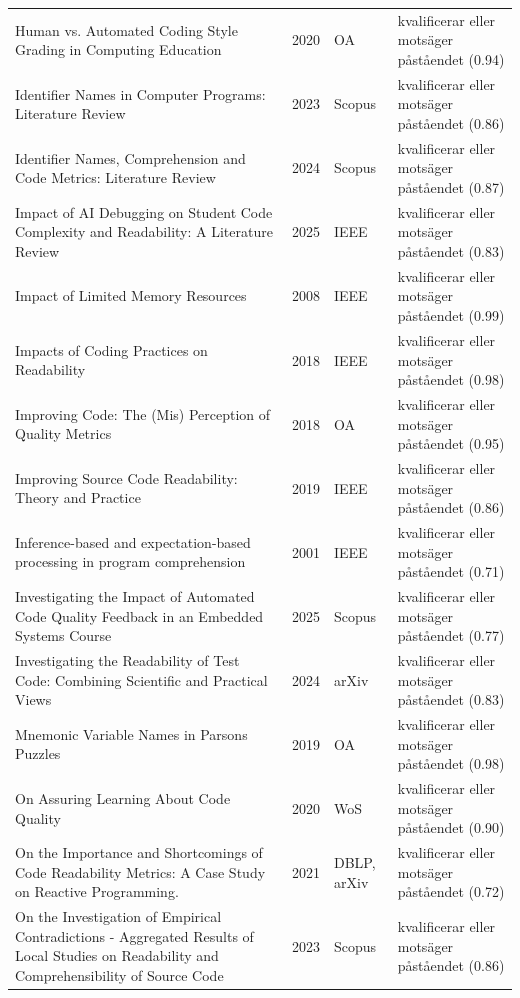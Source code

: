 \begin{longtable}{@{}%
  >{\raggedright\arraybackslash}p{}c%
  >{\raggedright\arraybackslash}p{}%
  >{\raggedright\arraybackslash}p{}@{}}
Human vs. Automated Coding Style Grading in Computing Education & 2020 & OA & kvalificerar eller motsäger påståendet (0.94) \\
Identifier Names in Computer Programs: Literature Review & 2023 & Scopus & kvalificerar eller motsäger påståendet (0.86) \\
Identifier Names, Comprehension and Code Metrics: Literature Review & 2024 & Scopus & kvalificerar eller motsäger påståendet (0.87) \\
Impact of AI Debugging on Student Code Complexity and Readability: A Literature Review & 2025 & IEEE & kvalificerar eller motsäger påståendet (0.83) \\
Impact of Limited Memory Resources & 2008 & IEEE & kvalificerar eller motsäger påståendet (0.99) \\
Impacts of Coding Practices on Readability & 2018 & IEEE & kvalificerar eller motsäger påståendet (0.98) \\
Improving Code: The (Mis) Perception of Quality Metrics & 2018 & OA & kvalificerar eller motsäger påståendet (0.95) \\
Improving Source Code Readability: Theory and Practice & 2019 & IEEE & kvalificerar eller motsäger påståendet (0.86) \\
Inference-based and expectation-based processing in program comprehension & 2001 & IEEE & kvalificerar eller motsäger påståendet (0.71) \\
Investigating the Impact of Automated Code Quality Feedback in an Embedded Systems Course & 2025 & Scopus & kvalificerar eller motsäger påståendet (0.77) \\
Investigating the Readability of Test Code: Combining Scientific and Practical Views & 2024 & arXiv & kvalificerar eller motsäger påståendet (0.83) \\
Mnemonic Variable Names in Parsons Puzzles & 2019 & OA & kvalificerar eller motsäger påståendet (0.98) \\
On Assuring Learning About Code Quality & 2020 & WoS & kvalificerar eller motsäger påståendet (0.90) \\
On the Importance and Shortcomings of Code Readability Metrics: A Case Study on Reactive Programming. & 2021 & DBLP, arXiv & kvalificerar eller motsäger påståendet (0.72) \\
On the Investigation of Empirical Contradictions - Aggregated Results of Local Studies on Readability and Comprehensibility of Source Code & 2023 & Scopus & kvalificerar eller motsäger påståendet (0.86) \\

\end{longtable}
